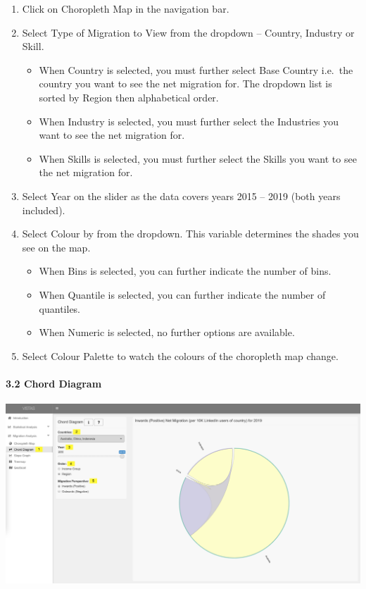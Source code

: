 \documentclass[
]{article}
\begin{document}
\begin{enumerate}
\def\labelenumi{\arabic{enumi}.}
\item
  Click on Choropleth Map in the navigation bar.
\item
  Select Type of Migration to View from the dropdown -- Country,
  Industry or Skill.

  \begin{itemize}
  \item
    When Country is selected, you must further select Base Country
    i.e.~the country you want to see the net migration for. The dropdown
    list is sorted by Region then alphabetical order.
  \item
    When Industry is selected, you must further select the Industries
    you want to see the net migration for.
  \item
    When Skills is selected, you must further select the Skills you want
    to see the net migration for.
  \end{itemize}
\item
  Select Year on the slider as the data covers years 2015 -- 2019 (both
  years included).
\item
  Select Colour by from the dropdown. This variable determines the
  shades you see on the map.

  \begin{itemize}
  \item
    When Bins is selected, you can further indicate the number of bins.
  \item
    When Quantile is selected, you can further indicate the number of
    quantiles.
  \item
    When Numeric is selected, no further options are available.
  \end{itemize}
\item
  Select Colour Palette to watch the colours of the choropleth map
  change.
\end{enumerate}

\hypertarget{chord-diagram}{%
\paragraph{3.2 Chord Diagram}\label{chord-diagram}}

\includegraphics{images/11-chord.png}
\end{document}
